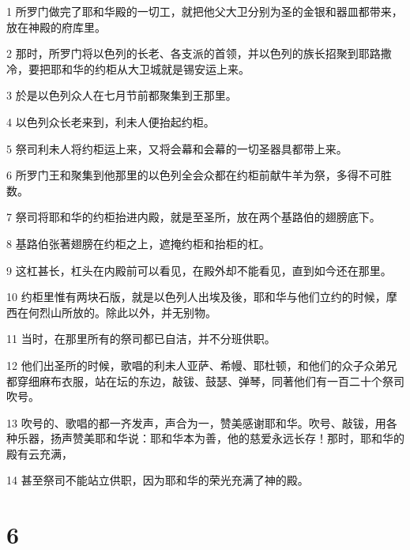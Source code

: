 \par 1 所罗门做完了耶和华殿的一切工，就把他父大卫分别为圣的金银和器皿都带来，放在神殿的府库里。
\par 2 那时，所罗门将以色列的长老、各支派的首领，并以色列的族长招聚到耶路撒冷，要把耶和华的约柜从大卫城就是锡安运上来。
\par 3 於是以色列众人在七月节前都聚集到王那里。
\par 4 以色列众长老来到，利未人便抬起约柜。
\par 5 祭司利未人将约柜运上来，又将会幕和会幕的一切圣器具都带上来。
\par 6 所罗门王和聚集到他那里的以色列全会众都在约柜前献牛羊为祭，多得不可胜数。
\par 7 祭司将耶和华的约柜抬进内殿，就是至圣所，放在两个基路伯的翅膀底下。
\par 8 基路伯张著翅膀在约柜之上，遮掩约柜和抬柜的杠。
\par 9 这杠甚长，杠头在内殿前可以看见，在殿外却不能看见，直到如今还在那里。
\par 10 约柜里惟有两块石版，就是以色列人出埃及後，耶和华与他们立约的时候，摩西在何烈山所放的。除此以外，并无别物。
\par 11 当时，在那里所有的祭司都已自洁，并不分班供职。
\par 12 他们出圣所的时候，歌唱的利未人亚萨、希幔、耶杜顿，和他们的众子众弟兄都穿细麻布衣服，站在坛的东边，敲钹、鼓瑟、弹琴，同著他们有一百二十个祭司吹号。
\par 13 吹号的、歌唱的都一齐发声，声合为一，赞美感谢耶和华。吹号、敲钹，用各种乐器，扬声赞美耶和华说：耶和华本为善，他的慈爱永远长存！那时，耶和华的殿有云充满，
\par 14 甚至祭司不能站立供职，因为耶和华的荣光充满了神的殿。

\chapter{6}

